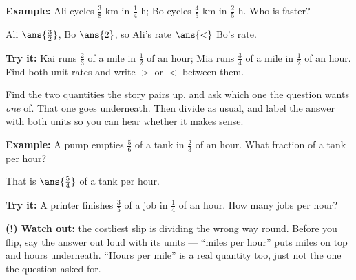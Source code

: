 \documentclass[12pt]{article}
\begin{document}
\begin{examplebox}
\textbf{Example:} Ali cycles $\frac{3}{8}$ km in $\frac{1}{4}$ h; Bo cycles
$\frac{4}{5}$ km in $\frac{2}{5}$ h. Who is faster?

Ali $\ans{\tfrac{3}{2}}$, Bo $\ans{2}$, so Ali's rate $\ans{<}$ Bo's rate.
\end{examplebox}

\begin{tryitbox}
\textbf{Try it:} Kai runs $\frac{2}{3}$ of a mile in $\frac{1}{2}$ of an hour;
Mia runs $\frac{3}{4}$ of a mile in $\frac{1}{2}$ of an hour. Find both unit
rates and write $>$ or $<$ between them.\\[2pt]
\end{tryitbox}


\begin{formulabox}
Find the two quantities the story pairs up, and ask which one the question
wants \emph{one} of. That one goes underneath. Then divide as usual, and label
the answer with both units so you can hear whether it makes sense.
\end{formulabox}

\begin{examplebox}
\textbf{Example:} A pump empties $\frac{5}{6}$ of a tank in $\frac{2}{3}$ of
an hour. What fraction of a tank per hour?

That is $\ans{\tfrac{5}{4}}$ of a tank per hour.
\end{examplebox}

\begin{tryitbox}
\textbf{Try it:} A printer finishes $\frac{3}{5}$ of a job in $\frac{1}{4}$ of
an hour. How many jobs per hour?\\[2pt]
\end{tryitbox}

\begin{watchoutbox}
\textbf{(!) Watch out:} the costliest slip is dividing the wrong way round.
Before you flip, say the answer out loud with its units --- ``miles per hour''
puts miles on top and hours underneath. ``Hours per mile'' is a real quantity
too, just not the one the question asked for.
\end{watchoutbox}
\end{document}

